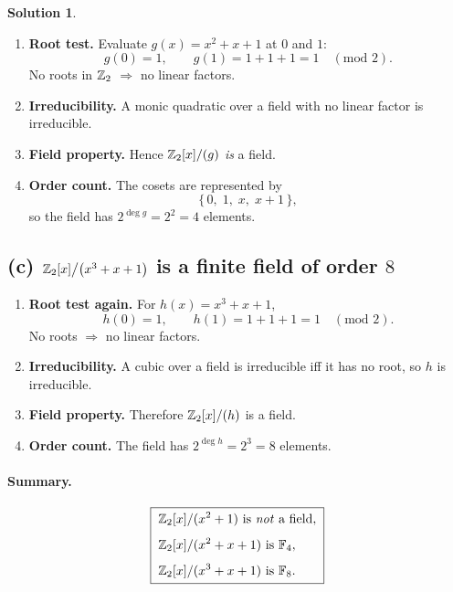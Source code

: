 \documentclass[12pt]{article}
\theoremstyle{definition} %
\newtheorem{solution}{Solution}
\theoremstyle{plain} %
\begin{document}
\begin{solution}
      \begin{enumerate}[label=\textbf{Step \arabic*:}, leftmargin=*]
        \item \textbf{Root test.}  
              Evaluate $g(x)=x^{2}+x+1$ at $0$ and $1$:
              \[
                g(0)=1,\qquad g(1)=1+1+1=1\quad(\text{mod }2).
              \]
              No roots in $\Bbb Z_{2}$ $\Longrightarrow$ no linear factors.
        \item \textbf{Irreducibility.}  
              A monic quadratic over a field with no linear factor is irreducible.
        \item \textbf{Field property.}  
              Hence $\Bbb Z_{2}[x]/(g)$ \emph{is} a field.
        \item \textbf{Order count.}  
              The cosets are represented by
              \[
                \{\,0,\;1,\;x,\;x+1\,\},
              \]
              so the field has $2^{\deg g}=2^{2}=4$ elements.
      \end{enumerate}
      
      \subsection*{(c)  $\Bbb Z_{2}[x]\bigl/\bigl(x^{3}+x+1\bigr)$ is a finite field of order $8$}
      
      \begin{enumerate}[label=\textbf{Step \arabic*:}, leftmargin=*]
        \item \textbf{Root test again.}  
              For $h(x)=x^{3}+x+1$,
              \[
                h(0)=1,\qquad h(1)=1+1+1=1\quad(\text{mod }2).
              \]
              No roots $\Longrightarrow$ no linear factors.
        \item \textbf{Irreducibility.}  
              A cubic over a field is irreducible iff it has no root, so $h$ is
              irreducible.
        \item \textbf{Field property.}  
              Therefore $\Bbb Z_{2}[x]/(h)$ is a field.
        \item \textbf{Order count.}  
              The field has $2^{\deg h}=2^{3}=8$ elements.
      \end{enumerate}
      
      \paragraph{Summary.}
      \[
        \boxed{\;
          \begin{aligned}
            &\Bbb Z_{2}[x]/(x^{2}+1)\text{ is \emph{not} a field},\\[4pt]
            &\Bbb Z_{2}[x]/(x^{2}+x+1)\text{ is }\mathbb{F}_{4},\\[4pt]
            &\Bbb Z_{2}[x]/(x^{3}+x+1)\text{ is }\mathbb{F}_{8}.
          \end{aligned}
        \;}
      \]
      \end{solution}
\end{document}
